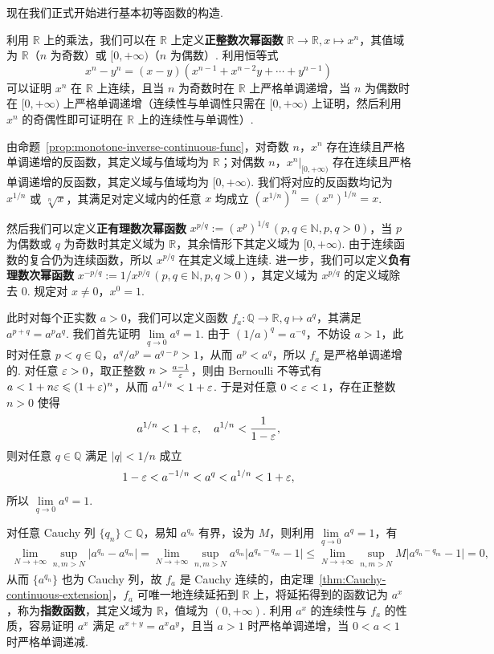\documentclass[../main.tex]{subfiles}
\begin{document}
现在我们正式开始进行基本初等函数的构造. 

利用 $\mathbb R$ 上的乘法，我们可以在 $\mathbb R$ 上定义\textbf{正整数次幂函数} $\mathbb R \to \mathbb R, x \mapsto x^n$，其值域为 $\mathbb R$（$n$ 为奇数）或 $[0, +\infty)$（$n$ 为偶数）. 利用恒等式 
$$
x^n - y^n = (x - y)(x^{n - 1} + x^{n - 2} y + \cdots + y^{n - 1})
$$
可以证明 $x^n$ 在 $\mathbb R$ 上连续，且当 $n$ 为奇数时在 $\mathbb R$ 上严格单调递增，当 $n$ 为偶数时在 $[0, +\infty)$ 上严格单调递增（连续性与单调性只需在 $[0, +\infty)$ 上证明，然后利用 $x^n$ 的奇偶性即可证明在 $\mathbb R$ 上的连续性与单调性）. 

由命题~\ref{prop:monotone-inverse-continuous-func}，对奇数 $n$，$x^n$ 存在连续且严格单调递增的反函数，其定义域与值域均为 $\mathbb R$；对偶数 $n$，$x^n|_{[0, +\infty)}$ 存在连续且严格单调递增的反函数，其定义域与值域均为 $[0, +\infty)$. 我们将对应的反函数均记为 $x^{1 / n}$ 或 $\sqrt[n]{x}$，其满足对定义域内的任意 $x$ 均成立 $(x^{1 / n})^n = (x^n)^{1 / n} = x$. 

然后我们可以定义\textbf{正有理数次幂函数} $x^{p / q} := (x^p)^{1 / q}\,(p, q \in \mathbb N, p, q > 0)$，当 $p$ 为偶数或 $q$ 为奇数时其定义域为 $\mathbb R$，其余情形下其定义域为 $[0, +\infty)$. 由于连续函数的复合仍为连续函数，所以 $x^{p / q}$ 在其定义域上连续. 进一步，我们可以定义\textbf{负有理数次幂函数} $x^{-p / q} := 1 / x^{p / q}\,(p, q \in \mathbb N, p, q > 0)$，其定义域为 $x^{p / q}$ 的定义域除去 0. 规定对 $x \neq 0$，$x^0 = 1$. 

此时对每个正实数 $a > 0$，我们可以定义函数 $f_a:\mathbb Q \to \mathbb R, q \mapsto a^q$，其满足 $a^{p + q} = a^p a^q$. 我们首先证明 $\lim\limits_{q \to 0} a^q = 1$. 由于 $(1 / a)^q = a^{-q}$，不妨设 $a > 1$，此时对任意 $p < q \in \mathbb Q$，$a^q / a^p = a^{q - p} > 1$，从而 $a^p < a^q$，所以 $f_a$ 是严格单调递增的. 对任意 $\varepsilon > 0$，取正整数 $n > \frac{a - 1}{\varepsilon}$，则由 Bernoulli 不等式有 $a < 1 + n\varepsilon \leqslant (1 + \varepsilon)^n$，从而 $a^{1 / n} < 1 + \varepsilon$. 于是对任意 $0 < \varepsilon < 1$，存在正整数 $n > 0$ 使得 
$$
a^{1 / n} < 1 + \varepsilon,\quad a^{1 / n} < \frac{1}{1 - \varepsilon}, 
$$
则对任意 $q \in \mathbb Q$ 满足 $|q| < 1 / n$ 成立
$$
1 - \varepsilon < a^{-1 / n} < a^q < a^{1 / n} < 1 + \varepsilon, 
$$
所以 $\lim\limits_{q \to 0} a^q = 1$. 

对任意 Cauchy 列 $\{q_n\} \subset \mathbb Q$，易知 $a^{q_n}$ 有界，设为 $M$，则利用 $\lim\limits_{q \to 0} a^q = 1$，有 
\begin{align*}
    \lim_{N \to +\infty} \sup_{n, m > N} |a^{q_n} - a^{q_m}| = \lim_{N \to +\infty} \sup_{n, m > N} a^{q_m}|a^{q_n - q_m} - 1| \leqslant \lim_{N \to +\infty} \sup_{n, m > N} M |a^{q_n - q_m} - 1| = 0, 
\end{align*}
从而 $\{a^{q_n}\}$ 也为 Cauchy 列，故 $f_a$ 是 Cauchy 连续的，由定理~\ref{thm:Cauchy-continuous-extension}，$f_a$ 可唯一地连续延拓到 $\mathbb R$ 上，将延拓得到的函数记为 $a^x$，称为\textbf{指数函数}，其定义域为 $\mathbb R$，值域为 $(0, +\infty)$. 利用 $a^x$ 的连续性与 $f_a$ 的性质，容易证明 $a^x$ 满足 $a^{x + y} = a^x a^y$，且当 $a > 1$ 时严格单调递增，当 $0 < a < 1$ 时严格单调递减. 
\end{document}
